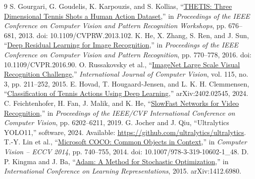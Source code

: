 \documentclass[12pt,a4paper]{article}
\begin{document}
\clearpage
\begin{thebibliography}{9}
 S. Gourgari, G. Goudelis, K. Karpouzis, and S. Kollias, ``\href{https://openaccess.thecvf.com/content_cvpr_workshops_2013/W08/papers/Gourgari_THETIS_Three_Dimensional_2013_CVPR_paper.pdf}{THETIS: Three Dimensional Tennis Shots a Human Action Dataset},'' in \emph{Proceedings of the IEEE Conference on Computer Vision and Pattern Recognition Workshops}, pp. 676--681, 2013. doi: 10.1109/CVPRW.2013.102.
 K. He, X. Zhang, S. Ren, and J. Sun, ``\href{https://openaccess.thecvf.com/content_cvpr_2016/html/He_Deep_Residual_Learning_CVPR_2016_paper.html}{Deep Residual Learning for Image Recognition},'' in \emph{Proceedings of the IEEE Conference on Computer Vision and Pattern Recognition}, pp. 770--778, 2016. doi: 10.1109/CVPR.2016.90.
 O. Russakovsky et al., ``\href{https://doi.org/10.1007/s11263-015-0816-y}{ImageNet Large Scale Visual Recognition Challenge},'' \emph{International Journal of Computer Vision}, vol. 115, no. 3, pp. 211--252, 2015.
 E. Hovad, T. Hougaard-Jensen, and L. K. H. Clemmensen, ``\href{https://arxiv.org/abs/2402.02545}{Classification of Tennis Actions Using Deep Learning},'' arXiv:2402.02545, 2024.
 C. Feichtenhofer, H. Fan, J. Malik, and K. He, ``\href{https://openaccess.thecvf.com/content_ICCV_2019/html/Feichtenhofer_SlowFast_Networks_for_Video_Recognition_ICCV_2019_paper.html}{SlowFast Networks for Video Recognition},'' in \emph{Proceedings of the IEEE/CVF International Conference on Computer Vision}, pp. 6202--6211, 2019.
 G. Jocher and J. Qiu, ``Ultralytics YOLO11,'' software, 2024. Available: \url{https://github.com/ultralytics/ultralytics}.
 T.-Y. Lin et al., ``\href{https://doi.org/10.1007/978-3-319-10602-1_48}{Microsoft COCO: Common Objects in Context},'' in \emph{Computer Vision -- ECCV 2014}, pp. 740--755, 2014. doi: 10.1007/978-3-319-10602-1\_48.
 D. P. Kingma and J. Ba, ``\href{https://arxiv.org/abs/1412.6980}{Adam: A Method for Stochastic Optimization},'' in \emph{International Conference on Learning Representations}, 2015. arXiv:1412.6980.
\end{thebibliography}
\end{document}
